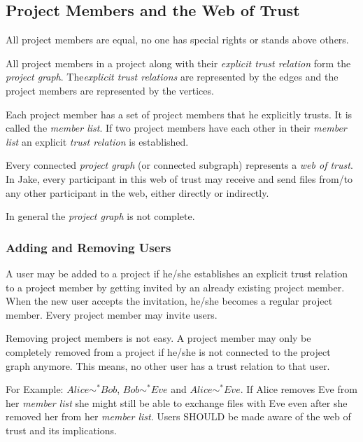 \subsection{Project Members and the Web of Trust}
All project members are equal, no one has special rights or stands above others.

All project members in a project along with their \emph{explicit trust relation} form the \emph{project graph}. The\emph{explicit trust relations} are represented by the edges and the project members are represented by the 
vertices.

Each project member has a set of project members that he explicitly trusts. It is called the \emph{member list}. If two project members have each other in their \emph{member list} an explicit \emph{trust relation} is established. 

Every connected \emph{project graph} (or connected subgraph) represents a \emph{web of trust}. In Jake, every participant in this web of trust may receive and send files from/to any other participant in the web, either directly or indirectly. 

In general the \emph{project graph} is not complete.

\subsubsection{Adding and Removing Users}
A user may be added to a project if he/she establishes an explicit trust relation to a project member by getting invited by an already existing project member. When the new user accepts the invitation, he/she becomes a regular project member. Every project member may invite users. 

Removing project members is not easy. A project member may only be completely removed from a project if he/she is not connected to the project graph anymore.
This means, no other user has a trust relation to that user.

For Example: $Alice \sim ^* Bob$, $Bob \sim ^* Eve$ and $Alice \sim ^* Eve$. If Alice removes Eve from her \emph{member list} she might still be able to exchange files with Eve even after she removed her from her \emph{member list}. Users SHOULD be made aware of the web of trust and its implications. 

